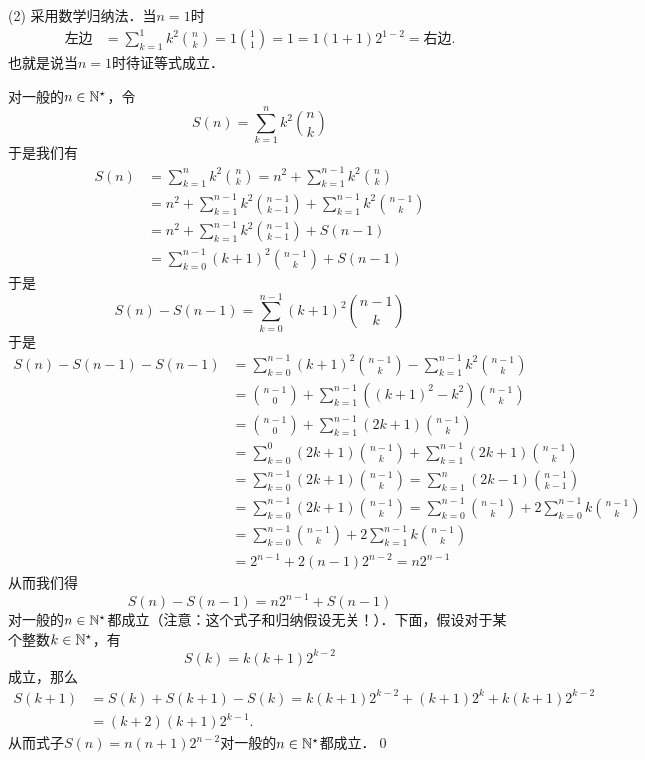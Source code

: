(2) \prove 采用数学归纳法．当$n=1$时
\begin{align}
    \text{左边} &= \sum_{k=1}^1 k^2 \binom{n}{k} = 1 \binom{1}{1} = 1 = 1(1+1) 2^{1-2} = \text{右边}.
\end{align}
也就是说当$n=1$时待证等式成立．

对一般的$n \in \mathbb{N}^\star$，令
\begin{equation}
    S(n) = \sum_{k=1}^n k^2 \binom{n}{k}
\end{equation}
于是我们有
\begin{align}
    S(n) &= \sum_{k=1}^{n} k^2 \binom{n}{k} = n^2 + \sum_{k=1}^{n-1} k^2 \binom{n}{k} \\
    &= n^2 + \sum_{k=1}^{n-1} k^2 \binom{n-1}{k-1} + \sum_{k=1}^{n-1} k^2 \binom{n-1}{k} \\
    &= n^2 + \sum_{k=1}^{n-1} k^2 \binom{n-1}{k-1} + S(n-1) \\
    &= \sum_{k=0}^{n-1} (k+1)^2 \binom{n-1}{k} + S(n-1)
\end{align}
于是
\begin{equation}
    S(n) - S(n-1) = \sum_{k=0}^{n-1} (k+1)^2 \binom{n-1}{k}
\end{equation}
于是
\begin{align}
    S(n) - S(n-1) - S(n-1) &= \sum_{k=0}^{n-1} (k+1)^2 \binom{n-1}{k} - \sum_{k=1}^{n-1} k^2 \binom{n-1}{k} \\
    &= \binom{n-1}{0} + \sum_{k=1}^{n-1} \left((k+1)^2 - k^2\right) \binom{n-1}{k} \\
    &= \binom{n-1}{0} + \sum_{k=1}^{n-1} \left(2k + 1\right) \binom{n-1}{k} \\
    &= \sum_{k=0}^{0} \left(2k+1\right) \binom{n-1}{k} + \sum_{k=1}^{n-1} \left(2k+1\right) \binom{n-1}{k} \\
    &= \sum_{k=0}^{n-1} \left(2k+1\right) \binom{n-1}{k} = \sum_{k=1}^{n} \left(2k-1\right) \binom{n-1}{k-1} \\
    &= \sum_{k=0}^{n-1} (2k+1) \binom{n-1}{k} = \sum_{k=0}^{n-1} \binom{n-1}{k} + 2\sum_{k=0}^{n-1}k \binom{n-1}{k} \\
    &= \sum_{k=0}^{n-1} \binom{n-1}{k} + 2 \sum_{k=1}^{n-1} k \binom{n-1}{k} \\
    &= 2^{n-1} + 2 (n-1) 2^{n-2} = n 2^{n-1}
\end{align}
从而我们得
\begin{equation}
    S(n) - S(n-1) = n 2^{n-1} + S(n-1)
\end{equation}
对一般的$n \in \mathbb{N}^\star$都成立（注意：这个式子和归纳假设无关！）．下面，假设对于某个整数$k \in \mathbb{N}^\star$，有
\begin{equation}
    S(k) = k(k+1)2^{k-2}
\end{equation}
成立，那么
\begin{align}
    S(k+1) &= S(k) + S(k+1) - S(k) = k(k+1) 2^{k-2} + (k+1)2^{k} + k(k+1)2^{k-2} \\
    &= (k+2)(k+1)2^{k-1}.
\end{align}
从而式子$S(n) = n(n+1)2^{n-2}$对一般的$n \in \mathbb{N}^\star$都成立．\qed\bigskip

